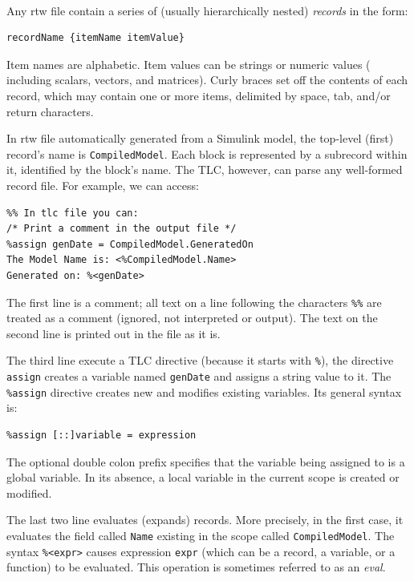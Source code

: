 \paragraph{} Any rtw file contain a series of (usually hierarchically nested) \emph{records} in the form:
\begin{verbatim}
recordName {itemName itemValue}
\end{verbatim}
Item names are alphabetic. Item values can be strings or numeric values ( including scalars, vectors, and matrices). Curly braces set off the contents of each record, which may contain one or more items, delimited by space, tab, and/or return characters.
\par In rtw file automatically generated from a Simulink model, the top-level (first) record’s name is \verb|CompiledModel|. Each block is represented by a subrecord within it, identified by the block’s name. The TLC, however, can parse any well-formed record file. For example, we can access:
\begin{lstlisting}
%% In tlc file you can:
/* Print a comment in the output file */
%assign genDate = CompiledModel.GeneratedOn
The Model Name is: <%CompiledModel.Name>
Generated on: %<genDate>
\end{lstlisting}
The first line is a comment; all text on a line following the characters \verb|%%| are treated as a comment (ignored, not interpreted or output). The text on the second line is printed out in the file as it is.
\par The third line execute a TLC directive (because it starts with \verb|%|), the directive \verb|assign| creates a variable named \verb|genDate| and assigns a string value to it. The \verb|%assign| directive creates new and modifies existing variables. Its general
syntax is:
\begin{verbatim}
%assign [::]variable = expression
\end{verbatim}
The optional double colon prefix specifies that the variable being assigned to is a global variable. In its absence, a local variable in the current scope is created or modified.
\par The last two line evaluates (expands) records. More precisely, in the first case, it evaluates the field called \verb|Name| existing in the scope called \verb|CompiledModel|. The syntax \verb|%<expr>| causes expression \verb|expr| (which can be a record, a variable, or a function) to be evaluated. This operation is sometimes referred to as an \emph{eval}.

